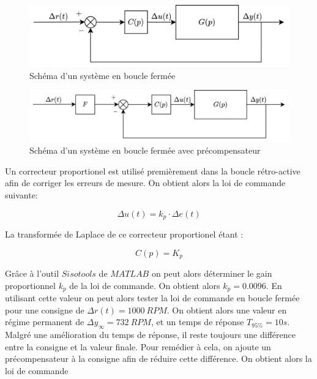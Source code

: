 \documentclass[12pt]{report}
\begin{document}
\begin{figure}[h]
  \centering
  \vspace{0.3cm}
  \includegraphics[scale=0.25]{fig/closed_loop_system.png}
  \caption{Schéma d'un système en boucle fermée}
\end{figure}

\begin{figure}[h]
  \centering
  \vspace{0.3cm}
  \includegraphics[scale=0.25]{fig/closed_loop_system_w-precomp.png}
  \caption{Schéma d'un système en boucle fermée avec précompensateur}
\end{figure}

Un correcteur proportionel est utilisé premièrement dans la boucle rétro-active
afin de corriger les erreurs de mesure. On obtient alors la loi de commande suivante:

\vspace{0.1cm}
\begin{equation}
  \Delta u(t) = k_p \cdot \Delta e(t)
\end{equation}
\vspace{0.1cm}

La transformée de Laplace de ce correcteur proportionel étant :

\vspace{0.1cm}
\begin{equation}
  C(p) = K_p
\end{equation}
\vspace{0.1cm}

Grâce à l'outil $Sisotools$ de $MATLAB$ on peut alors déterminer le gain
proportionnel $k_p$ de la loi de commande. On obtient alors $k_p = 0.0096$.
En utilisant cette valeur on peut alors tester la loi de commande en boucle fermée
pour une consigne de $\Delta r(t) = 1000 ~ RPM$. On obtient alors une valeur en régime
permanent de $\Delta y_{\infty} = 732 ~ RPM$, et un temps de réponse $T_{95\%} = 10s$.
Malgré une amélioration du temps de réponse, il reste toujours une différence entre
la consigne et la valeur finale. Pour remédier à cela, on ajoute un précompensateur
à la consigne afin de réduire cette différence. On obtient alors la loi de commande
\end{document}
